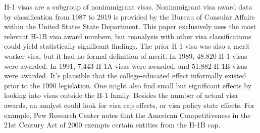 \documentclass[review]{elsarticle}
\begin{document}
    H-1 visas are a subgroup of nonimmigrant visas.
    Nonimmigrant visa award data by classification from 1987 to 2019 is provided by
    the Bureau of Consular Affairs within the United States State Department\cite{bureauof_2020}.
    This paper exclusively uses the most relevant H-1B visa award numbers,
    but reanalysis with other visa classifications could yield statistically significant findings.
    The prior H-1 visa was also a merit worker visa, but it had no formal definition of merit.
    In 1989, 48,820 H-1 visas were awarded.
    In 1991, 7,443 H-1A visas were awarded, and 51,882 H-1B visas were awarded.
    It's plausible that the college-educated effect informally existed prior to the 1990 legislation.
    One might also find small but significant effects by looking into visas outside the H-1 family.
    Besides the number of actual visa awards, an analyst could look for visa cap effects,
    or visa policy state effects.
    For example, Pew Research Center notes that the American Competitiveness in the 21st Century Act of 2000 exempts certain entities from the H-1B cap\cite{ruiz2017key}.
\end{document}
